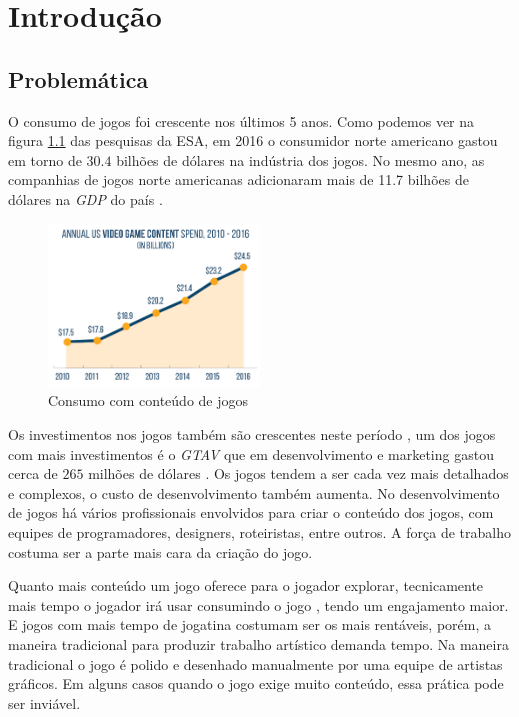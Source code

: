 
\chapter{Introdução}

\section{Problemática}
O consumo de jogos foi crescente nos últimos 5 anos. Como podemos ver na figura
\ref{fig:esa_graph_2017} das pesquisas da ESA,
em 2016 o consumidor norte americano gastou em torno de $30.4$
bilhões de dólares na indústria dos jogos. No mesmo ano, as companhias de jogos
norte americanas adicionaram mais de 11.7 bilhões de dólares na \textit{GDP}
do país \cite{entertainment2017essential}.
\begin{figure}[H]
    \centering
    \includegraphics[width=0.5\textwidth]{figuras/ESAGraph2017.png}
    \caption{Consumo com conteúdo de jogos\cite{entertainment2017essential}}
    \label{fig:esa_graph_2017}
\end{figure}

Os investimentos nos jogos também são crescentes neste
período \cite{entertainment2017essential}, um dos jogos com mais investimentos é
o \textit{GTAV} que em desenvolvimento e marketing gastou cerca de $265$
milhões de dólares \cite{villapaz2013gta}. Os jogos tendem a ser cada vez mais
detalhados e complexos, o custo de desenvolvimento também aumenta.
No desenvolvimento de jogos há vários profissionais envolvidos para criar
o conteúdo dos jogos, com equipes de programadores, designers,  roteiristas,
entre outros. A força de trabalho costuma ser a parte mais cara da
criação do jogo.


Quanto mais conteúdo um jogo oferece para o jogador explorar, tecnicamente 
mais tempo o jogador irá usar consumindo o jogo \cite{fernando2009costas}, tendo um engajamento maior.
E jogos com mais tempo de jogatina costumam ser os mais rentáveis, porém,
a maneira tradicional para produzir trabalho artístico demanda tempo. Na maneira
tradicional o jogo é polido e desenhado manualmente por uma equipe de artistas gráficos. Em alguns casos 
quando o jogo exige muito conteúdo, essa prática pode ser inviável.


